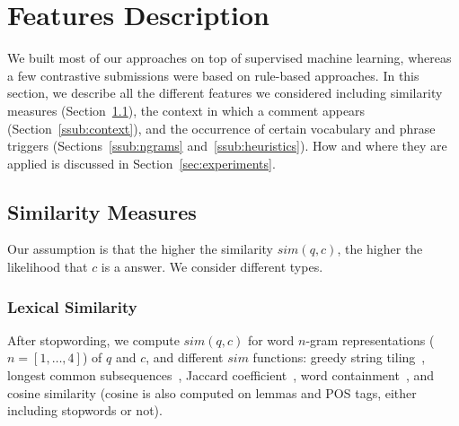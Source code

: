 \section{Features Description}
\label{sec:approach}

We built most of our approaches on top of supervised machine learning, whereas 
a few contrastive submissions were based on rule-based approaches. In this 
section, we describe all the different features we considered including 
similarity measures (Section~\ref{sub:sim}), the context in which a comment 
appears (Section~\ref{ssub:context}), and the occurrence of certain vocabulary 
and phrase triggers (Sections~\ref{ssub:ngrams} and~\ref{ssub:heuristics}). How 
and where they are applied is discussed in Section~\ref{sec:experiments}.

% 

\subsection{Similarity Measures}
\label{sub:sim}

Our assumption is that the higher the similarity  $sim(q,c)$, the higher the 
likelihood that $c$ is a \good answer. We consider different types.

\subsubsection{Lexical Similarity}

After stopwording, we compute $sim(q, c)$ for word $n$-gram representations 
($n=[1,\ldots,4]$) of $q$ and $c$, and different $sim$ functions: greedy 
string tiling~\cite{Wise:1996}, longest common 
subsequences~\cite{Allison:1986}, Jaccard coefficient~\cite{Jaccard:1901}, word 
containment~\cite{Lyon:2001}, and cosine similarity (cosine is also computed on 
lemmas and POS tags, either including stopwords or not).

